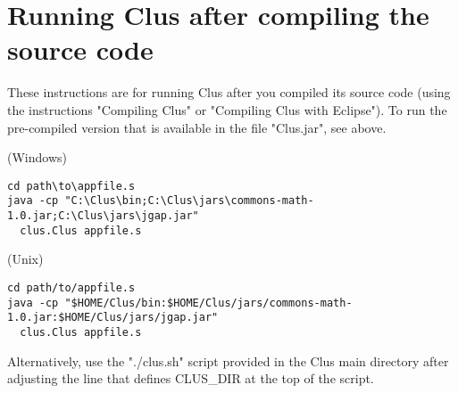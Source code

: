\section{Running Clus after compiling the source code}

These instructions are for running Clus after you compiled its source code (using the instructions "Compiling Clus" or "Compiling Clus with Eclipse"). To run the pre-compiled version that is available in the file "Clus.jar", see above.

(Windows)
\begin{small}
\begin{verbatim}
cd path\to\appfile.s
java -cp "C:\Clus\bin;C:\Clus\jars\commons-math-1.0.jar;C:\Clus\jars\jgap.jar" 
  clus.Clus appfile.s
\end{verbatim}
\end{small}

(Unix)

\begin{small}
\begin{verbatim}
cd path/to/appfile.s
java -cp "$HOME/Clus/bin:$HOME/Clus/jars/commons-math-1.0.jar:$HOME/Clus/jars/jgap.jar" 
  clus.Clus appfile.s
\end{verbatim}
\end{small}

Alternatively, use the "./clus.sh" script provided in the Clus main directory after adjusting the line that defines CLUS\_DIR at the top of the script.





